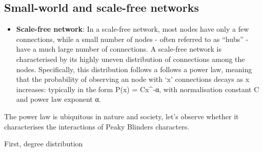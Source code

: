 \documentclass[
]{article}
\providecommand{\tightlist}{%
  \setlength{\itemsep}{0pt}\setlength{\parskip}{0pt}}
\begin{document}
\hypertarget{small-world-and-scale-free-networks}{%
\subsection{Small-world and scale-free
networks}\label{small-world-and-scale-free-networks}}

\begin{itemize}
\tightlist
\item
  \textbf{Scale-free network}: In a scale-free network, most nodes have
  only a few connections, while a small number of nodes - often referred
  to as ``hubs'' - have a much large number of connections. A scale-free
  network is characterised by its highly uneven distribution of
  connections among the nodes. Specifically, this distribution follows a
  follows a power law, meaning that the probability of observing an node
  with `x' connections decays as x increases: typically in the form P(x)
  = Cx\^{}-α, with normalisation constant C and power law exponent α.
\end{itemize}

The power law is ubiquitous in nature and society, let's observe whether
it characterises the interactions of Peaky Blinders characters.

First, degree distribution
\end{document}
